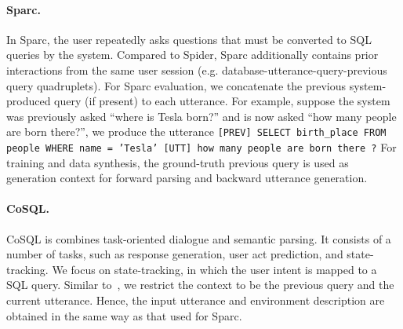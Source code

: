 \documentclass[11pt,a4paper]{article}
\begin{document}
\paragraph{Sparc.}
In Sparc, the user repeatedly asks questions that must be converted to SQL queries by the system.
Compared to Spider, Sparc additionally contains prior interactions from the same user session (e.g. database-utterance-query-previous query quadruplets).
For Sparc evaluation, we concatenate the previous system-produced query (if present) to each utterance.
For example, suppose the system was previously asked ``where is Tesla born?'' and is now asked ``how many people are born there?'', we produce the utterance \texttt{[PREV] SELECT birth\_place FROM people WHERE name = 'Tesla' [UTT] how many people are born there ?}
For training and data synthesis, the ground-truth previous query is used as generation context for forward parsing and backward utterance generation.



\paragraph{CoSQL.}
CoSQL is combines task-oriented dialogue and semantic parsing.
It consists of a number of tasks, such as response generation, user act prediction, and state-tracking.
We focus on state-tracking, in which the user intent is mapped to a SQL query.
Similar to~\citet{zhang2019editing}, we restrict the context to be the previous query and the current utterance.
Hence, the input utterance and environment description are obtained in the same way as that used for Sparc.
\end{document}
